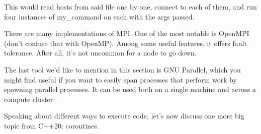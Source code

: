 This would read hosts from said file one by one, connect to each of them, and run four instances of my\_command on each with the args passed.

There are many implementations of MPI. One of the most notable is OpenMPI (don't confuse that with OpenMP). Among some useful features, it offers fault tolerance. After all, it's not uncommon for a node to go down.

The last tool we'd like to mention in this section is GNU Parallel, which you might find useful if you want to easily span processes that perform work by spawning parallel processes. It can be used both on a single machine and across a compute cluster.

Speaking about different ways to execute code, let's now discuss one more big topic from C++20: coroutines.



















